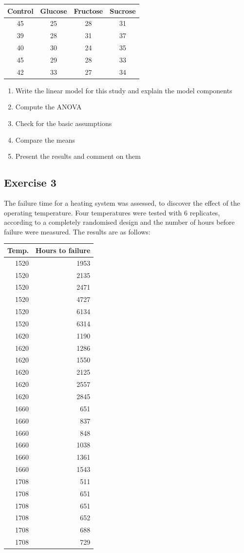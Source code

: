 \documentclass[a4paper,12pt,oneside]{book}
\providecommand{\tightlist}{%
  \setlength{\itemsep}{0pt}\setlength{\parskip}{0pt}}
\begin{document}
\begin{longtable}[]{@{}cccc@{}}
\toprule
Control & Glucose & Fructose & Sucrose \\
\midrule
\endhead
45 & 25 & 28 & 31 \\
39 & 28 & 31 & 37 \\
40 & 30 & 24 & 35 \\
45 & 29 & 28 & 33 \\
42 & 33 & 27 & 34 \\
\bottomrule
\end{longtable}

\begin{enumerate}
\def\labelenumi{\arabic{enumi}.}
\tightlist
\item
  Write the linear model for this study and explain the model components
\item
  Compute the ANOVA
\item
  Check for the basic assumptions
\item
  Compare the means
\item
  Present the results and comment on them
\end{enumerate}

\hypertarget{exercise-3-4}{%
\subsection{Exercise 3}\label{exercise-3-4}}

The failure time for a heating system was assessed, to discover the effect of the operating temperature. Four temperatures were tested with 6 replicates, according to a completely randomised design and the number of hours before failure were measured.
The results are as follows:

\begin{longtable}[]{@{}rr@{}}
\toprule
Temp. & Hours to failure \\
\midrule
\endhead
1520 & 1953 \\
1520 & 2135 \\
1520 & 2471 \\
1520 & 4727 \\
1520 & 6134 \\
1520 & 6314 \\
1620 & 1190 \\
1620 & 1286 \\
1620 & 1550 \\
1620 & 2125 \\
1620 & 2557 \\
1620 & 2845 \\
1660 & 651 \\
1660 & 837 \\
1660 & 848 \\
1660 & 1038 \\
1660 & 1361 \\
1660 & 1543 \\
1708 & 511 \\
1708 & 651 \\
1708 & 651 \\
1708 & 652 \\
1708 & 688 \\
1708 & 729 \\
\bottomrule
\end{longtable}
\end{document}
